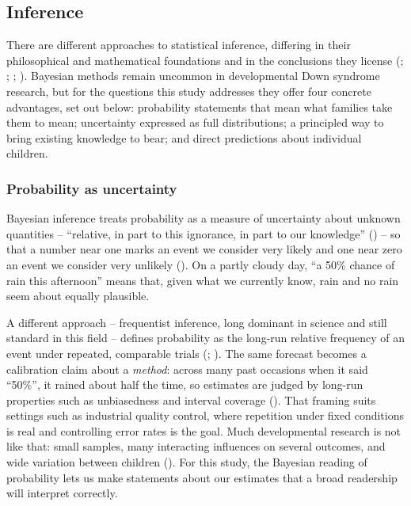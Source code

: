 \documentclass[
  11pt,
  a4paper,
]{report}
\begin{document}
\subsection{Inference}\label{inference}

There are different approaches to statistical inference, differing in
their philosophical and mathematical foundations and in the conclusions
they license (;
; ;
). Bayesian methods remain uncommon in developmental Down syndrome
research, but for the questions this study addresses they offer four
concrete advantages, set out below: probability statements that mean
what families take them to mean; uncertainty expressed as full
distributions; a principled way to bring existing knowledge to bear; and
direct predictions about individual children.

\subsubsection{Probability as
uncertainty}\label{probability-as-uncertainty}

Bayesian inference treats probability as a measure of uncertainty about
unknown quantities -- ``relative, in part to this ignorance, in part to
our knowledge''
() -- so that a number near one marks an event we consider very
likely and one near zero an event we consider very unlikely
(). On a
partly cloudy day, ``a 50\% chance of rain this afternoon'' means that,
given what we currently know, rain and no rain seem about equally
plausible.

A different approach -- frequentist inference, long dominant in science
and still standard in this field -- defines probability as the long-run
relative frequency of an event under repeated, comparable trials
(;
). The same forecast becomes a calibration claim about a
\emph{method}: across many past occasions when it said ``50\%'', it
rained about half the time, so estimates are judged by long-run
properties such as unbiasedness and interval coverage
(). That framing suits settings such as industrial quality control,
where repetition under fixed conditions is real and controlling error
rates is the goal. Much developmental research is not like that: small
samples, many interacting influences on several outcomes, and wide
variation between children
(). For this study, the Bayesian reading of probability lets
us make statements about our estimates that a broad readership will
interpret correctly.
\end{document}
